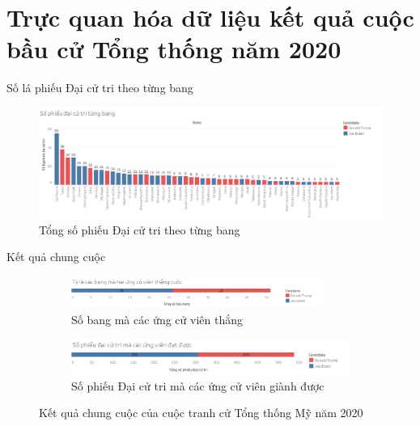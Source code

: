 \documentclass[10pt]{beamer}
\theoremstyle{remark}
\theoremstyle{definition}
\begin{document}
\section{Trực quan hóa dữ liệu kết quả cuộc bầu cử Tổng thống năm 2020}

\begin{frame}{Số lá phiếu Đại cử tri theo từng bang}
	\begin{figure}[h!]
        \centering
        \includegraphics[width=\textwidth]{figures/State_Electoral_Votes_Bar_Chart.png}
        \caption{Tổng số phiếu Đại cử tri theo từng bang}
    \end{figure}
\end{frame}


\begin{frame}{Kết quả chung cuộc}
	\begin{figure}[h!]
        \centering
        \begin{subfigure}[b]{\textwidth}
            \includegraphics[width=0.9\textwidth]{figures/State_Candidate_Win.png}
            \caption{Số bang mà các ứng cử viên thắng}
        \end{subfigure}
        \vfill
        \begin{subfigure}[b]{\linewidth}
            \includegraphics[width=0.9\linewidth]{figures/Electoral_Vote_Candidate_Win.png}
            \caption{Số phiếu Đại cử tri mà các ứng cử viên giành được}
        \end{subfigure}
        \caption{Kết quả chung cuộc của cuộc tranh cử Tổng thống Mỹ năm 2020}
    \end{figure}
\end{frame}
\end{document}

